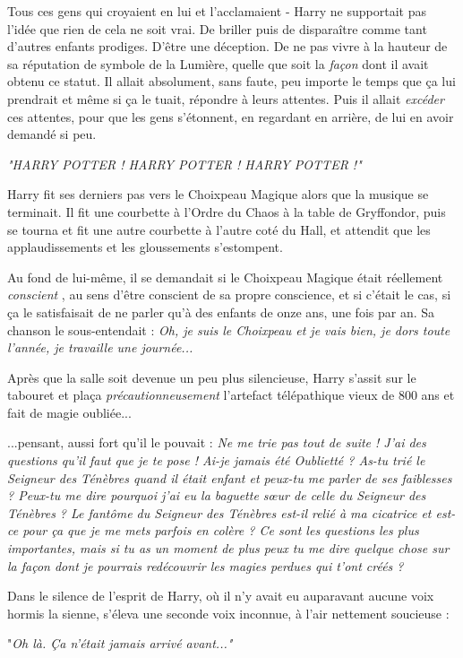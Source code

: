 Tous ces gens qui croyaient en lui et l'acclamaient - Harry ne supportait pas l'idée que rien de cela ne soit vrai. De briller puis de disparaître comme tant d'autres enfants prodiges. D'être une déception. De ne pas vivre à la hauteur de sa réputation de symbole de la Lumière, quelle que soit la \emph{façon}  dont il avait obtenu ce statut. Il allait absolument, sans faute, peu importe le temps que ça lui prendrait et même si ça le tuait, répondre à leurs attentes. Puis il allait \emph{excéder}  ces attentes, pour que les gens s'étonnent, en regardant en arrière, de lui en avoir demandé si peu.

\emph{"HARRY POTTER ! HARRY POTTER ! HARRY POTTER !"} 

Harry fit ses derniers pas vers le Choixpeau Magique alors que la musique se terminait. Il fit une courbette à l'Ordre du Chaos à la table de Gryffondor, puis se tourna et fit une autre courbette à l'autre coté du Hall, et attendit que les applaudissements et les gloussements s'estompent.

Au fond de lui-même, il se demandait si le Choixpeau Magique était réellement \emph{conscient} , au sens d'être conscient de sa propre conscience, et si c'était le cas, si ça le satisfaisait de ne parler qu'à des enfants de onze ans, une fois par an. Sa chanson le sous-entendait : \emph{Oh, je suis le Choixpeau et je vais bien, je dors toute l'année, je travaille une journée...} 

Après que la salle soit devenue un peu plus silencieuse, Harry s'assit sur le tabouret et plaça \emph{précautionneusement}  l'artefact télépathique vieux de 800 ans et fait de magie oubliée...

...pensant, aussi fort qu'il le pouvait : \emph{Ne me trie pas tout de suite ! J'ai des questions qu'il faut que je te pose ! Ai-je jamais été Oublietté ? As-tu trié le Seigneur des Ténèbres quand il était enfant et peux-tu me parler de ses faiblesses ? Peux-tu me dire pourquoi j'ai eu la baguette sœur de celle du Seigneur des Ténèbres ? Le fantôme du Seigneur des Ténèbres est-il relié à ma cicatrice et est-ce pour ça que je me mets parfois en colère ? Ce sont les questions les plus importantes, mais si tu as un moment de plus peux tu me dire quelque chose sur la façon dont je pourrais redécouvrir les magies perdues qui t'ont créés ?} 

Dans le silence de l'esprit de Harry, où il n'y avait eu auparavant aucune voix hormis la sienne, s'éleva une seconde voix inconnue, à l'air nettement soucieuse :

"\emph{Oh là. Ça n'était jamais arrivé avant..."} 

